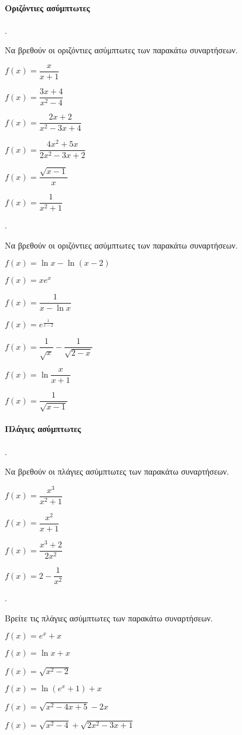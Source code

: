 \documentclass[11pt,a4paper,twocolumn]{article}
\newcounter{askhsh}
\newcommand{\askhsh}{\large\theaskhsh.\ \addtocounter{askhsh}{1}}
\begin{document}
\paragraph{Οριζόντιες ασύμπτωτες}
\askhsh Να βρεθούν οι οριζόντιες ασύμπτωτες των παρακάτω συναρτήσεων.
\begin{multicols}{2}
\begin{alist}[leftmargin=5mm]
\item $f(x)=\dfrac{x}{x+1}$
\item $f(x)=\dfrac{3x+4}{x^2-4}$
\item $f(x)=\dfrac{2x+2}{x^2-3x+4}$
\item $f(x)=\dfrac{4x^2+5x}{2x^2-3x+2}$
\item $f(x)=\dfrac{\sqrt{x-1}}{x}$
\item $f(x)=\dfrac{1}{x^2+1}$
\end{alist}
\end{multicols}
\askhsh Να βρεθούν οι οριζόντιες ασύμπτωτες των παρακάτω συναρτήσεων.
\begin{alist}
\item $f(x)=\ln{x}-\ln{(x-2)}$
\item $f(x)=xe^x$
\item $f(x)=\dfrac{1}{x-\ln{x}}$
\item $f(x)=e^{\frac{1}{x-2}}$
\item $f(x)=\dfrac{1}{\sqrt{x}}-\dfrac{1}{\sqrt{2-x}}$
\item $f(x)=\ln\dfrac{x}{x+1}$
\item $f(x)=\dfrac{1}{\sqrt{x-1}}$
\end{alist}
\paragraph{Πλάγιες ασύμπτωτες}
\askhsh Να βρεθούν οι πλάγιες ασύμπτωτες των παρακάτω συναρτήσεων.
\begin{multicols}{2}
\begin{alist}
\item $f(x)=\dfrac{x^3}{x^2+1}$
\item $f(x)=\dfrac{x^2}{x+1}$
\item $f(x)=\dfrac{x^3+2}{2x^2}$
\item $f(x)=2-\dfrac{1}{x^2}$
\end{alist}
\end{multicols}
\askhsh Βρείτε τις πλάγιες ασύμπτωτες των παρακάτω συναρτήσεων.
\begin{alist}
\begin{multicols}{2}
\item $f(x)=e^x+x$
\item $f(x)=\ln{x}+x$
\item $f(x)=\sqrt{x^2-2}$
\end{multicols}
\item $f(x)=\ln{\left(e^x+1\right)}+x$
\item $f(x)=\sqrt{x^2-4x+5}-2x$
\item $f(x)=\sqrt{x^2-4}+\sqrt{2x^2-3x+1}$
\end{alist}
\end{document}
